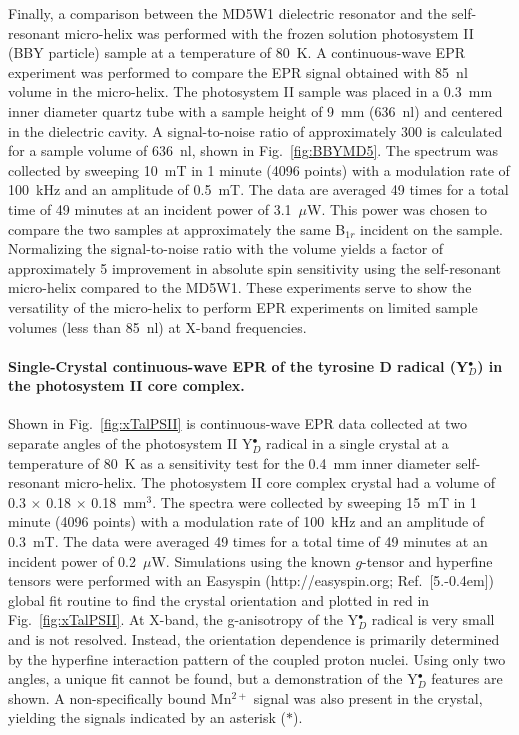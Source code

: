 Finally, a comparison between the MD5W1 dielectric resonator and the self-resonant micro-helix was performed with the frozen solution photosystem II (BBY particle) sample at a temperature of 80~K. A continuous-wave EPR experiment was performed to compare the EPR signal obtained with 85~nl volume in the micro-helix. The photosystem II sample was placed in a 0.3~mm inner diameter quartz tube with a sample height of 9~mm (636~nl) and centered in the dielectric cavity. A signal-to-noise ratio of approximately 300 is calculated for a sample volume of 636~nl, shown in Fig.~\ref{fig:BBYMD5}. The spectrum was collected by sweeping 10~mT in 1 minute (4096 points) with a modulation rate of 100~kHz and an amplitude of 0.5~mT. The data are averaged 49 times for a total time of 49 minutes at an incident power of 3.1~$\mu$W. This power was chosen to compare the two samples at approximately the same B$_{1r}$ incident on the sample. Normalizing the signal-to-noise ratio with the volume yields a factor of approximately 5 improvement in absolute spin sensitivity using the self-resonant micro-helix compared to the MD5W1. These experiments serve to show the versatility of the micro-helix to perform EPR experiments on limited sample volumes (less than 85~nl) at X-band frequencies.

\paragraph{Single-Crystal continuous-wave EPR of the tyrosine D radical (Y$_D^\bullet$) in the photosystem II core complex.}
Shown in Fig.~\ref{fig:xTalPSII} is continuous-wave EPR data collected at two separate angles of the photosystem II Y$_D^\bullet$ radical in a single crystal at a temperature of 80~K as a sensitivity test for the 0.4~mm inner diameter self-resonant micro-helix. The photosystem II core complex crystal had a volume of 0.3 $\times$ 0.18 $\times$ 0.18~mm$^3$. The spectra were collected by sweeping 15~mT in 1 minute (4096 points) with a modulation rate of 100~kHz and an amplitude of 0.3~mT. The data were averaged 49 times for a total time of 49 minutes at an incident power of 0.2~$\mu$W. Simulations using the known $g$-tensor and hyperfine tensors \cite{Hofbauer6623} were performed with an Easyspin (http://easyspin.org; Ref.~[5.\kern-0.4em]) global fit routine to find the crystal orientation and plotted in red in Fig.~\ref{fig:xTalPSII}. At X-band, the g-anisotropy of the Y$_D^\bullet$ radical is very small and is not resolved. Instead, the orientation dependence is primarily determined by the hyperfine interaction pattern of the coupled proton nuclei. \cite{Hofbauer6623} Using only two angles, a unique fit cannot be found, but a demonstration of the Y$_D^\bullet$ features are shown. A non-specifically bound Mn$^{2+}$ signal was also present in the crystal, yielding the signals indicated by an asterisk (\mbox{\large $\ast$}). 

